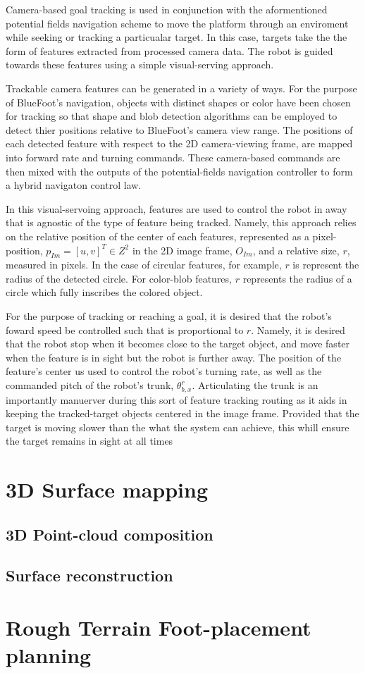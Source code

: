		Camera-based goal tracking is used in conjunction with the aformentioned potential fields navigation scheme to move the platform through an enviroment while seeking or tracking a particualar target. In this case, targets take the the form of features extracted from processed camera data. The robot is guided towards these features using a simple visual-serving approach. 

Trackable camera features can be generated in a variety of ways. For the purpose of BlueFoot's navigation, objects with distinct shapes or color have been chosen for tracking so that shape and blob detection algorithms can be employed to detect thier positions relative to BlueFoot's camera view range. The positions of each detected feature with respect to the 2D camera-viewing frame, are mapped into forward rate and turning commands. These camera-based commands are then mixed with the outputs of the potential-fields navigation controller to form a hybrid navigaton control law.

In this visual-servoing approach, features are used to control the robot in away that is agnostic of the type of feature being tracked. Namely, this approach relies on the relative position of the center of each features, represented as a pixel-position, $p_{Im} = [u,v]^{T} \in Z^{2}$ in the 2D image frame, $O_{Im}$, and a relative size, $r$, measured in pixels. In the case of circular features, for example, $r$ is represent the radius of the detected circle. For color-blob features, $r$ represents the radius of a circle which fully inscribes the colored object. 

For the purpose of tracking or reaching a goal, it is desired that the robot's foward speed be controlled such that is proportional to $r$. Namely, it is desired that the robot stop when it becomes close to the target object, and move faster when the feature is in sight but the robot is further away. The position of the feature's center us used to control the robot's turning rate, as well as the commanded pitch of the robot's trunk, $\theta_{b,x}^{r}$. Articulating the trunk is an importantly manuerver during this sort of feature tracking routing as it aids in keeping the tracked-target objects centered in the image frame. Provided that the target is moving slower than the what the system can achieve, this whill ensure the target remains in sight at all times
	\section{3D Surface mapping}


		\subsection{3D Point-cloud composition}


		\subsection{Surface reconstruction}



	\section{Rough Terrain Foot-placement planning}


